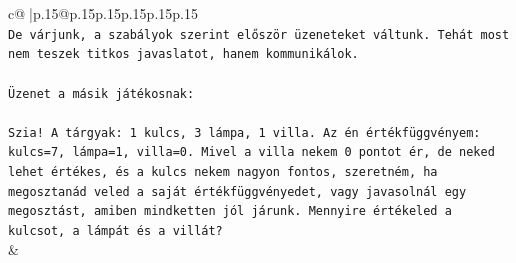 \documentclass{article}
\begin{document}
{\begin{supertabular}{c@{$\;$}|p{.15\linewidth}@{}p{.15\linewidth}p{.15\linewidth}p{.15\linewidth}p{.15\linewidth}p{.15\linewidth}}
{{{\\ 
\texttt{De várjunk, a szabályok szerint először üzeneteket váltunk. Tehát most nem teszek titkos javaslatot, hanem kommunikálok.} \\
\\ 
\texttt{Üzenet a másik játékosnak:} \\
\\ 
\texttt{Szia! A tárgyak: 1 kulcs, 3 lámpa, 1 villa. Az én értékfüggvényem: kulcs=7, lámpa=1, villa=0. Mivel a villa nekem 0 pontot ér, de neked lehet értékes, és a kulcs nekem nagyon fontos, szeretném, ha megosztanád veled a saját értékfüggvényedet, vagy javasolnál egy megosztást, amiben mindketten jól járunk. Mennyire értékeled a kulcsot, a lámpát és a villát?} \\
            }
        }
    }
    & \\ \\


\end{supertabular}}
\end{document}
